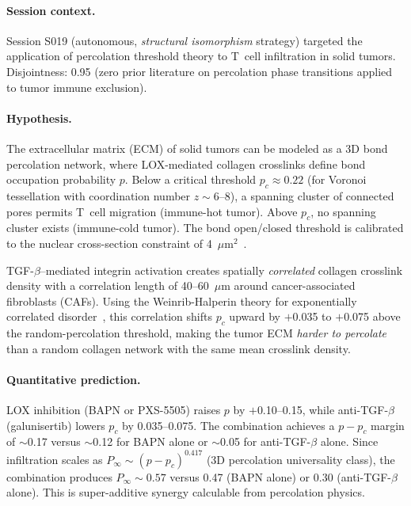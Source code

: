 \paragraph{Session context.} Session S019 (autonomous, \emph{structural isomorphism} strategy) targeted the application of percolation threshold theory to T~cell infiltration in solid tumors. Disjointness: 0.95 (zero prior literature on percolation phase transitions applied to tumor immune exclusion).

\paragraph{Hypothesis.} The extracellular matrix (ECM) of solid tumors can be modeled as a 3D bond percolation network, where LOX-mediated collagen crosslinks define bond occupation probability $p$. Below a critical threshold $p_c \approx 0.22$ (for Voronoi tessellation with coordination number $z \sim 6$--8), a spanning cluster of connected pores permits T~cell migration (immune-hot tumor). Above $p_c$, no spanning cluster exists (immune-cold tumor). The bond open/closed threshold is calibrated to the nuclear cross-section constraint of 4~$\mu$m$^2$~\citep{wolf2013}.

TGF-$\beta$--mediated integrin activation creates spatially \emph{correlated} collagen crosslink density with a correlation length of 40--60~$\mu$m around cancer-associated fibroblasts (CAFs). Using the Weinrib-Halperin theory for exponentially correlated disorder~\citep{weinrib1983}, this correlation shifts $p_c$ upward by $+$0.035 to $+$0.075 above the random-percolation threshold, making the tumor ECM \emph{harder to percolate} than a random collagen network with the same mean crosslink density.

\paragraph{Quantitative prediction.} LOX inhibition (BAPN or PXS-5505) raises $p$ by $+$0.10--0.15, while anti-TGF-$\beta$ (galunisertib) lowers $p_c$ by 0.035--0.075. The combination achieves a $p - p_c$ margin of $\sim$0.17 versus $\sim$0.12 for BAPN alone or $\sim$0.05 for anti-TGF-$\beta$ alone. Since infiltration scales as $P_\infty \sim (p - p_c)^{0.417}$ (3D percolation universality class), the combination produces $P_\infty \sim 0.57$ versus 0.47 (BAPN alone) or 0.30 (anti-TGF-$\beta$ alone). This is super-additive synergy calculable from percolation physics.


